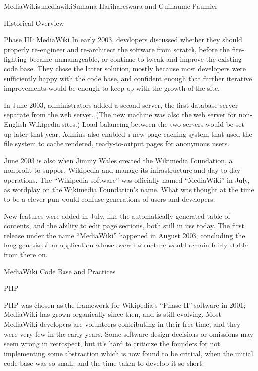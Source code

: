 \begin{aosachapter}{MediaWiki}{s:mediawiki}{Sumana Harihareswara and Guillaume Paumier}
\begin{aosasect1}{Historical Overview}
\begin{aosasect2}{Phase III: MediaWiki}
In early 2003, developers discussed whether they should properly
re-engineer and re-architect the software from scratch, before the
fire-fighting became unmanageable, or continue to tweak and improve
the existing code base. They chose the latter solution, mostly because
most developers were sufficiently happy with the code base, and
confident enough that further iterative improvements would be enough
to keep up with the growth of the site.

In June 2003, administrators added a second server, the first database
server separate from the web server. (The new machine was also the web
server for non-English Wikipedia sites.) Load-balancing between the
two servers would be set up later that year. Admins also enabled a new
page caching system that used the file system to cache rendered,
ready-to-output pages for anonymous users.

June 2003 is also when Jimmy Wales created the Wikimedia Foundation, a
nonprofit to support Wikipedia and manage its infrastructure and
day-to-day operations. The ``Wikipedia software'' was officially named
``MediaWiki'' in July, as wordplay on the Wikimedia Foundation's
name. What was thought at the time to be a clever pun would confuse
generations of users and developers.

New features were added in July, like the automatically-generated
table of contents, and the ability to edit page sections, both still
in use today. The first release under the name ``MediaWiki'' happened in
August 2003, concluding the long genesis of an application whose
overall structure would remain fairly stable from there on.

\end{aosasect2}

\end{aosasect1}

\begin{aosasect1}{MediaWiki Code Base and Practices}

\begin{aosasect2}{PHP}

PHP was chosen as the framework for Wikipedia's ``Phase II'' software in
2001; MediaWiki has grown organically since then, and is still
evolving. Most MediaWiki developers are volunteers contributing in
their free time, and they were very few in the early years. Some
software design decisions or omissions may seem wrong in retrospect,
but it's hard to criticize the founders for not implementing some
abstraction which is now found to be critical, when the initial code
base was so small, and the time taken to develop it so short.


\end{aosasect2}
\end{aosasect1}
\end{aosachapter}
